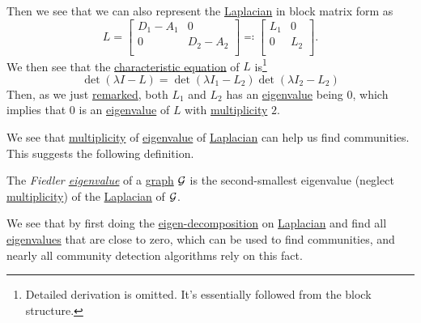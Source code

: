 Then we see that we can also represent the \hyperref[def:Laplacian]{Laplacian} in block matrix form as
\[
	L = \begin{bmatrix}
		D_{1} - A_{1} & 0         \\
		0             & D_2 - A_2 \\
	\end{bmatrix} \eqqcolon \begin{bmatrix}
		L_{1} & 0   \\
		0     & L_2 \\
	\end{bmatrix}.
\]
We then see that the \hyperref[note:characteristic-equation]{characteristic equation} of \(L\) is\footnote{Detailed derivation is omitted. It's essentially followed from the block structure.}
\[
	\det(\lambda I - L) = \det(\lambda I_1 - L_2)\det(\lambda  I_2 - L_2)
\]
Then, as we just \hyperref[rmk:property-of-Laplacian]{remarked}, both \(L_1\) and \(L_2\) has an \hyperref[def:eigenvalue]{eigenvalue} being \(0\), which implies that \(0\) is an \hyperref[def:eigenvalue]{eigenvalue} of \(L\) with \hyperref[def:multiplicity]{multiplicity} \(2\).

We see that \hyperref[def:multiplicity]{multiplicity} of \hyperref[def:eigenvalue]{eigenvalue} of \hyperref[def:Laplacian]{Laplacian} can help us find communities. This suggests the following definition.

\begin{definition}\label{def:Filder-eigenvalue}
	The \emph{Fiedler \hyperref[def:eigenvalue]{eigenvalue}} of a \hyperref[def:graph]{graph} \(\mathcal{\MakeUppercase{g}}\) is the second-smallest eigenvalue (neglect \hyperref[def:multiplicity]{multiplicity}) of the \hyperref[def:Laplacian]{Laplacian} of \(\mathcal{\MakeUppercase{g}}\).
\end{definition}

We see that by first doing the \hyperref[thm:eigen-decomposition]{eigen-decomposition} on \hyperref[def:Laplacian]{Laplacian} and find all \hyperref[def:eigenvalue]{eigenvalues} that are close to zero, which can be used to find communities, and nearly all community detection algorithms rely on this fact.

